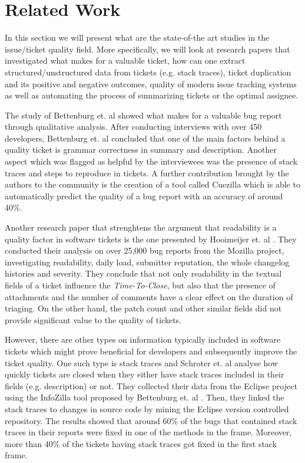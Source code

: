\documentclass{mpaper}
\begin{document}
\section{Related Work}\label{related_work}

In this section we will present what are the state-of-the art studies in the issue/ticket quality 
field. More specifically, we will look at research papers that investigated what makes for a valuable ticket, 
how can one extract structured/unstructured data from tickets (e.g. stack traces), ticket duplication and its 
positive and negative outcomes, quality of modern issue tracking systems as well as automating the process 
of summarizing tickets or the optimal assignee. 

The study of Bettenburg et. al \cite{bettenburg2008makes} showed what 
makes for a valuable bug report through qualitative analysis. 
After conducting interviews with over 450 developers, Bettenburg et. al concluded that one of the main factors
behind a quality ticket is grammar correctness in summary and description. Another
aspect which was flagged as helpful by the interviewees was the presence of stack 
traces and steps to reproduce in tickets. A further contribution brought by the
authors to the community is the creation of a tool called Cuezilla which is able 
to automatically predict the quality of a bug report with an accuracy of around 40\%.

Another research paper that strenghtens the argument that readability is a quality 
factor in software tickets is the one presented by Hooimeijer et. al \cite{hooimeijer2007modeling}.
They conducted their analysis on over 25,000 bug reports from the Mozilla project, 
investigating readability, daily load, submitter reputation, the whole changelog histories 
and severity. They conclude that not only readability in the textual fields of a ticket
influence the \emph{Time-To-Close}, but also that the presence of attachments and 
the number of comments have a clear effect on the duration of triaging. On the 
other hand, the patch count and other similar fields did not provide significant 
value to the quality of tickets.

However, there are other types on information typically included in software tickets 
which might prove beneficial for developers and subsequently improve the ticket quality.
One such type is stack traces and Schroter et. al \cite{schroter2010stack} analyse how 
quickly tickets are closed when they either have stack traces included in their fields 
(e.g. description) or not. They collected their data from the Eclipse project using 
the InfoZilla tool proposed by Bettenburg et. al \cite{bettenburg2008extracting}.
Then, they linked the stack traces to changes in source code by mining the Eclipse version 
controlled repository. The results showed that 
around 60\% of the bugs that contained stack traces in their reports were fixed
in one of the methods in the frame. Moreover, more than 40\% of the tickets having stack traces
got fixed in the first stack frame.
\end{document}

